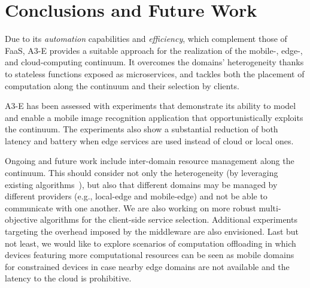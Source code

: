 \section{Conclusions and Future Work}\label{sec:conclusions}

Due to its \textit{automation} capabilities and \textit{efficiency}, which complement those of FaaS, A3-E provides a suitable approach for the realization of the mobile-, edge-, and cloud-computing continuum. It overcomes the domains' heterogeneity thanks to stateless functions exposed as microservices, and tackles both the placement of computation along the continuum and their selection by clients.

A3-E has been assessed with experiments that demonstrate its ability to model and enable a mobile image recognition application that opportunistically exploits the continuum. The experiments also show a substantial reduction of both latency and battery when edge services are used instead of cloud or local ones. 

Ongoing and future work include inter-domain resource management along the continuum. This should consider not only the heterogeneity (by leveraging existing algorithms~\cite{Tarneberg2017}), but also that different domains may be managed by different providers (e.g., local-edge and mobile-edge) and not be able to communicate with one another. We are also working on more robust multi-objective algorithms for the client-side service selection. Additional experiments targeting the overhead imposed by the middleware are also envisioned.
Last but not least, 
we would like to explore scenarios of computation offloading in which devices featuring more computational resources can be seen as mobile domains for constrained devices in case nearby edge domains are not available and the latency to the cloud is prohibitive.